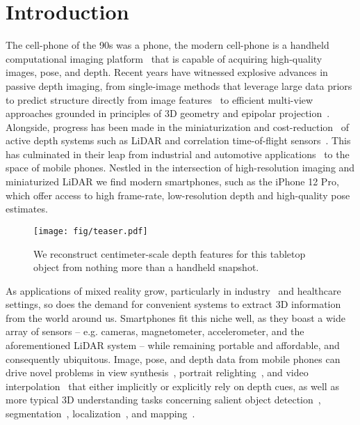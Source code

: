 \section{Introduction}
The cell-phone of the 90s was a phone, the modern cell-phone is a handheld computational imaging platform~\cite{delbracio2021mobile} that is capable of acquiring high-quality images, pose, and depth. Recent years have witnessed explosive advances in passive depth imaging, from single-image methods that leverage large data priors to predict structure directly from image features~\cite{ranftl2021vision,ranftl2019towards} to efficient multi-view approaches grounded in principles of 3D geometry and epipolar projection~\cite{tankovich2021hitnet, shamsafar2021mobilestereonet}. Alongside, progress has been made in the miniaturization and cost-reduction~\cite{callenberg2021low} of active depth systems such as LiDAR and correlation time-of-flight sensors~\cite{lange2001solid}. This has culminated in their leap from industrial and automotive applications~\cite{schwarz2010mapping,dong2017lidar} to the space of mobile phones. Nestled in the intersection of high-resolution imaging and miniaturized LiDAR we find modern smartphones, such as the iPhone 12 Pro, which offer access to high frame-rate, low-resolution depth and high-quality pose estimates.

\begin{figure}[t]
    \centering
    \texttt{[image: fig/teaser.pdf]}
    \caption{We reconstruct centimeter-scale depth features for this tabletop object from nothing more than a handheld snapshot.}
    \label{fig:my_label}
    \vspace{-1em}
\end{figure}

As applications of mixed reality grow, particularly in industry~\cite{li2018critical} and healthcare~\cite{gerup2020augmented} settings, so does the demand for convenient systems to extract 3D information from the world around us. Smartphones fit this niche well, as they boast a wide array of sensors -- e.g. cameras, magnetometer, accelerometer, and the aforementioned LiDAR system -- while remaining portable and affordable, and consequently ubiquitous. Image, pose, and depth data from mobile phones can drive novel problems in view synthesis~\cite{mildenhall2020nerf, park2021nerfies}, portrait relighting~\cite{pandey2021total,sun2019single}, and video interpolation~\cite{bao2019depth} that either implicitly or explicitly rely on depth cues, as well as more typical 3D understanding tasks concerning salient object detection~\cite{zhang2021bts,fan2020rethinking}, segmentation~\cite{schwarz2018rgb}, localization~\cite{zhuang2021semantic}, and mapping~\cite{schops2019bad, mur2017orb}.  

